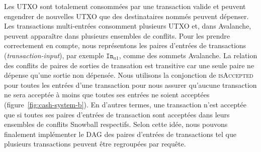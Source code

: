 \documentclass[letterpaper,twocolumn,10pt]{article}
\theoremstyle{definition}
\begin{document}
Les UTXO sont totalement consommées par une transaction valide et peuvent engendrer de nouvelles UTXO que des destinataires nommés peuvent dépenser.
Les transactions multi-entrées consomment plusieurs UTXO et, dans Avalanche, peuvent apparaître dans plusieurs ensembles de conflits.
Pour les prendre correctement en compte, nous représentons les paires d'entrées de transactions (\emph{transaction-input}), par exemple $\texttt{In}_{a1}$, comme des sommets Avalanche.
La relation des conflits de paires de sorties de transation est transitive car une seule paire ne dépense qu'une sortie non dépensée.
Nous utilisons la conjonction de \textsc{isAccepted} pour toutes les entrées d'une transaction pour nous assurer qu'aucune transaction ne sera acceptée à moins que toutes ses entrées ne soient acceptées (figure~\ref{fig:cash-system-b}). En d'autres termes, une transaction n'est acceptée que si toutes ses paires d'entrées de transaction sont acceptées dans leurs ensembles de conflits Snowball respectifs.
Selon cette idée, nous pouvons finalement implémenter le DAG des paires d'entrées de transactions tel que plusieurs transactions peuvent être regroupées par requête.


\end{document}
